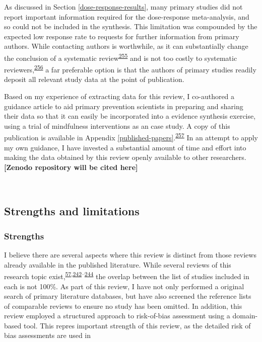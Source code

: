 \documentclass[a4paper, twoside]{templates/ociamthesis}
\begin{document}
As discussed in Section \ref{dose-response-results}, many primary studies did not report important information required for the dose-response meta-analysis, and so could not be included in the synthesis. This limitation was compounded by the expected low response rate to requests for further information from primary authors. While contacting authors is worthwhile, as it can substantially change the conclusion of a systematic review\textsuperscript{\protect\hyperlink{ref-meursingereynders2019}{255}} and is not too costly to systematic reviewers,\textsuperscript{\protect\hyperlink{ref-cooper2019}{256}} a far preferable option is that the authors of primary studies readily deposit all relevant study data at the point of publication.

Based on my experience of extracting data for this review, I co-authored a guidance article to aid primary prevention scientists in preparing and sharing their data so that it can easily be incorporated into a evidence synthesis exercise, using a trial of mindfulness interventions as an case study. A copy of this publication is available in Appendix \ref{published-papers}.\textsuperscript{\protect\hyperlink{ref-hennessy2021}{257}} In an attempt to apply my own guidance, I have invested a substantial amount of time and effort into making the data obtained by this review openly available to other researchers. \textbf{{[}Zenodo repository will be cited here{]}}

~

\hypertarget{strengths-and-limitations}{%
\subsection{Strengths and limitations}\label{strengths-and-limitations}}

\hypertarget{strengths}{%
\subsubsection{Strengths}\label{strengths}}

I believe there are several aspects where this review is distinct from those reviews already available in the published literature. While several reviews of this research topic exist,\textsuperscript{\protect\hyperlink{ref-chu2018}{57},\protect\hyperlink{ref-yang2020}{242}--\protect\hyperlink{ref-poly2020}{244}} the overlap between the list of studies included in each is not 100\%. As part of this review, I have not only performed a original search of primary literature databases, but have also screened the reference lists of comparable reviews to ensure no study has been omitted. In addition, this review employed a structured approach to risk-of-bias assessment using a domain-based tool. This repres important strength of this review, as the detailed risk of bias assessments are used in
\end{document}
